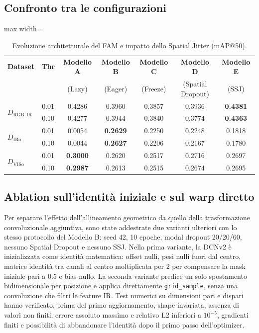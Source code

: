 \documentclass[a4paper,11pt]{article}
\begin{document}
\subsection{Confronto tra le configurazioni}

\begin{table}[htbp]
\centering
\caption{Evoluzione architetturale del FAM e impatto dello Spatial Jitter (mAP@50).}
\label{tab:rtdetr_fam_archit}
\begin{adjustbox}{max width=\textwidth}
\begin{tabular}{lc|ccccc}
\toprule
\textbf{Dataset} & \textbf{Thr} & \textbf{Modello A} & \textbf{Modello B} &
\textbf{Modello C} & \textbf{Modello D} & \textbf{Modello E} \\
& & (Lazy) & (Eager) & (Freeze) & (Spatial Dropout) & (SSJ) \\
\midrule
\multirow{2}{*}{$D_{\text{RGB--IR}}$} & 0.01 & 0.4286 & 0.3960 & 0.3857 & 0.3936 & \textbf{0.4381} \\
& 0.10 & 0.4277 & 0.3944 & 0.3840 & 0.3774 & \textbf{0.4363} \\
\midrule
\multirow{2}{*}{$D_{\text{IRo}}$} & 0.01 & 0.0054 & \textbf{0.2629} & 0.2250 & 0.2248 & 0.1818 \\
& 0.10 & 0.0044 & \textbf{0.2627} & 0.2206 & 0.2167 & 0.1780 \\
\midrule
\multirow{2}{*}{$D_{\text{VISo}}$} & 0.01 & \textbf{0.3000} & 0.2620 & 0.2517 & 0.2716 & 0.2697 \\
& 0.10 & \textbf{0.2987} & 0.2613 & 0.2515 & 0.2674 & 0.2695 \\
\bottomrule
\end{tabular}
\end{adjustbox}
\end{table}

\subsection{Ablation sull'identità iniziale e sul warp diretto}

Per separare l'effetto dell'allineamento geometrico da quello della
trasformazione convoluzionale aggiuntiva, sono state addestrate due varianti
ulteriori con lo stesso protocollo del Modello B: seed 42, 10 epoche, modal
dropout 20/20/60, nessuno Spatial Dropout e nessuno SSJ. Nella prima variante,
la DCNv2 è inizializzata come identità matematica: offset nulli, pesi nulli
fuori dal centro, matrice identità tra canali al centro moltiplicata per 2 per
compensare la mask iniziale pari a 0.5 e bias nullo. La seconda variante
predice un solo spostamento bidimensionale per posizione e applica direttamente
\texttt{grid\_sample}, senza una convoluzione che filtri le feature IR.
Test numerici su dimensioni pari e dispari hanno verificato, prima del primo
aggiornamento, shape invariata, assenza di valori non finiti, errore assoluto
massimo e relativo L2 inferiori a $10^{-5}$, gradienti finiti e possibilità
di abbandonare l'identità dopo il primo passo dell'optimizer.
\end{document}
